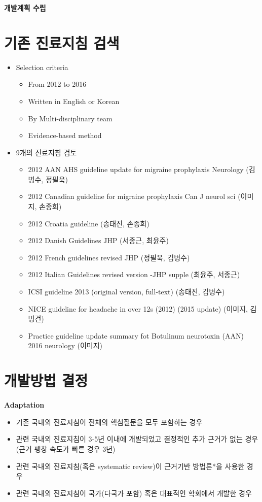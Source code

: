 \documentclass{paper}
\begin{document}
\Large \textbf{개발계획 수립} \normalsize

\section{기존 진료지침 검색}
	\begin{itemize}
		\item Selection criteria
			\begin{itemize}
				\item From 2012 to 2016
				\item Written in English or Korean
				\item By Multi-disciplinary team
				\item Evidence-based method
			\end{itemize}
		\item 9개의 진료지침 검토
		\begin{itemize}
			\item 2012 AAN AHS guideline update for migraine prophylaxis Neurology (김병수, 정필욱)
			\item 2012 Canadian guideline for migraine prophylaxis Can J neurol sci (이미지, 손종희)
			\item 2012 Croatia guideline (송태진, 손종희)
			\item 2012 Danish Guidelines JHP (서종근, 최윤주)
			\item 2012 French guidelines revised JHP (정필욱, 김병수)
			\item 2012 Italian Guidelines revised version -JHP supple (최윤주, 서종근) 
			\item ICSI guideline 2013 (original version, full-text) (송태진, 김병수)
			\item NICE guideline for headache in over 12s (2012) (2015 update) (이미지, 김병건)
			\item Practice guideline update summary fot Botulinum neurotoxin (AAN) 2016 neurology (이미지)
		\end{itemize}
	\end{itemize}
	
\section{개발방법 결정}

\textbf{Adaptation}
\begin{itemize}
	\item 기존 국내외 진료지침이 전체의 핵심질문을 모두 포함하는 경우
	\item 관련 국내외 진료지침이 3-5년 이내에 개발되었고 결정적인 추가 근거가 없는 경우
(근거 팽창 속도가 빠른 경우 3년)
	\item 관련 국내외 진료지침(혹은 systematic review)이 근거기반 방법론*을 사용한 경우
	\item 관련 국내외 진료지침이 국가(다국가 포함) 혹은 대표적인 학회에서 개발한 경우
\end{itemize}
\end{document}
